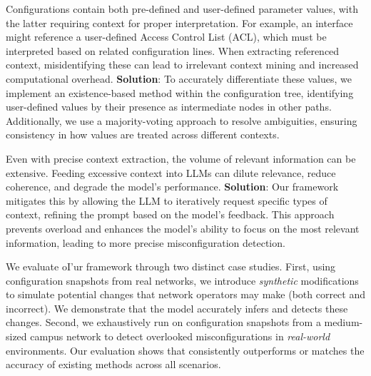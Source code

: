 Configurations contain both pre-defined and user-defined parameter values, with the latter requiring context for proper interpretation. For example, an interface might reference a user-defined Access Control List (ACL), which must be interpreted based on related configuration lines. When extracting referenced context, misidentifying these can lead to irrelevant context mining and increased computational overhead. \textbf{Solution}: To accurately differentiate these values, we implement an existence-based method within the configuration tree, identifying user-defined values by their presence as intermediate nodes in other paths. Additionally, we use a majority-voting approach to resolve ambiguities, ensuring consistency in how values are treated across different contexts.

Even with precise context extraction, the volume of relevant information can be extensive. 
Feeding excessive context into LLMs can dilute relevance, reduce coherence, and degrade the model’s performance.
\textbf{Solution}: Our framework mitigates this by allowing the LLM to iteratively request specific types of context, refining the prompt based on the model’s feedback. This approach prevents overload and enhances the model’s ability to focus on the most relevant information, leading to more precise misconfiguration detection.

We evaluate oI'ur framework through two distinct case studies.
First, using configuration snapshots from real networks, we introduce {\em synthetic} modifications to simulate potential changes that network operators may make (both correct and incorrect). We demonstrate that the model accurately infers and detects these changes. 
Second, we exhaustively run \sysname{} on configuration snapshots from a medium-sized campus network to detect overlooked misconfigurations in {\em real-world} environments. Our evaluation shows that \sysname{} consistently outperforms or matches the accuracy of existing methods across all scenarios.